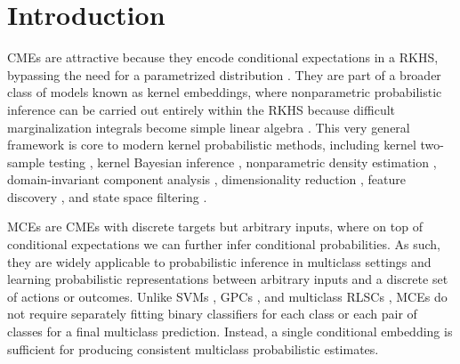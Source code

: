 \documentclass[twoside]{article}
\begin{document}
	\section{Introduction}
	\label{sec:introduction}
	
		
		
		
		
		
		\Glspl{CME} are attractive because they encode conditional expectations in a \gls{RKHS}, bypassing the need for a parametrized distribution \citep{song2013kernel}. They are part of a broader class of models known as kernel embeddings, where nonparametric probabilistic inference can be carried out entirely within the \gls{RKHS} because difficult marginalization integrals become simple linear algebra \citep{muandet2016kernel}. This very general framework is core to modern kernel probabilistic methods, including kernel two-sample testing \citep{gretton2007kernel}, kernel Bayesian inference  \citep{fukumizu2013kernel}, nonparametric density estimation \citep{song2008tailoring, kanagawa2014recovering}, domain-invariant component analysis \citep{muandet2013domain}, dimensionality reduction \citep{fukumizu2004dimensionality}, feature discovery \citep{jitkrittum2016interpretable}, and state space filtering \citep{kanagawa2016filtering}.
		
		
		\Glspl{MCE} are \glspl{CME} with discrete targets but arbitrary inputs, where on top of conditional expectations we can further infer conditional probabilities. As such, they are widely applicable to probabilistic inference in multiclass settings and learning probabilistic representations between arbitrary inputs and a discrete set of actions or outcomes. Unlike \glspl{SVM} \citep{scholkopf2002learning}, \glspl{GPC} \citep{rasmussen2006gaussian}, and multiclass \glspl{RLSC} \citep{rifkin2003regularized, pahikkala2012unsupervised}, \Glspl{MCE} do not require separately fitting binary classifiers for each class or each pair of classes for a final multiclass prediction. Instead, a single conditional embedding is sufficient for producing consistent multiclass probabilistic estimates.
		
\end{document}
